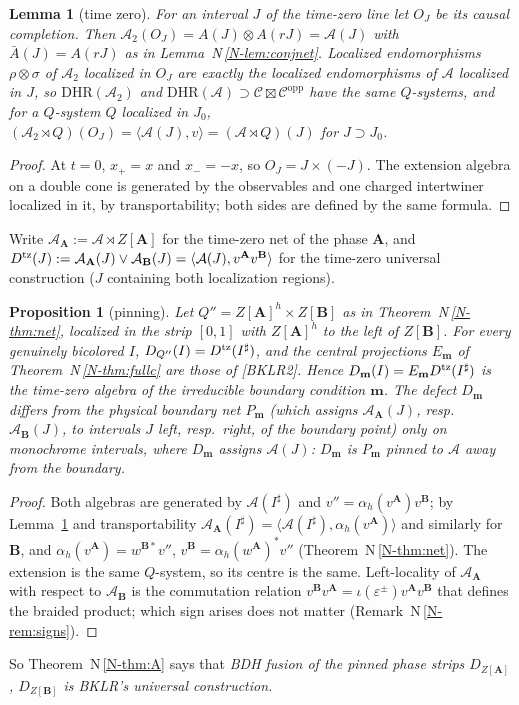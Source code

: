 \documentclass[11pt]{article}
\newtheorem{lemma}[theorem]{Lemma}
\newtheorem{proposition}[theorem]{Proposition}
\theoremstyle{definition}
\theoremstyle{remark}
\newcommand{\cA}{\mathcal A}
\newcommand{\bfB}{\mathbf B}
\newcommand{\bfA}{\mathbf A}
\newcommand{\nref}[1]{N\,\ref{N-#1}}
\begin{document}
\begin{lemma}[time zero]\label{lem:tz}
For an interval $J$ of the time-zero line let $O_J$ be its causal completion. Then $\cA_2(O_J)=A(J)\otimes A(rJ)=\cA(J)$ with $\bar A(J)=A(rJ)$ as in Lemma~\nref{lem:conjnet}. Localized endomorphisms $\rho\otimes\sigma$ of $\cA_2$ localized in $O_J$ are exactly the localized endomorphisms of $\cA$ localized in $J$, so $\mathrm{DHR}(\cA_2)$ and $\mathrm{DHR}(\cA)\supset\mathcal C\boxtimes\mathcal C^{\mathrm{opp}}$ have the same $Q$-systems, and for a $Q$-system $Q$ localized in $J_0$, $(\cA_2\rtimes Q)(O_J)=\langle\cA(J),v\rangle=(\cA\rtimes Q)(J)$ for $J\supset J_0$.
\end{lemma}
\begin{proof}
At $t=0$, $x_+=x$ and $x_-=-x$, so $O_J=J\times(-J)$. The extension algebra on a double cone is generated by the observables and one charged intertwiner localized in it, by transportability; both sides are defined by the same formula.
\end{proof}
Write $\cA_{\bfA}:=\cA\rtimes Z[\bfA]$ for the time-zero net of the phase $\bfA$, and $D^{\rm tz}(J):=\cA_{\bfA}(J)\vee\cA_{\bfB}(J)=\langle\cA(J),v^{\bfA}v^{\bfB}\rangle$ for the time-zero universal construction ($J$ containing both localization regions).

\begin{proposition}[pinning]\label{prop:pinning}
Let $Q''=Z[\bfA]^h\times Z[\bfB]$ as in Theorem~\nref{thm:net}, localized in the strip $[0,1]$ with $Z[\bfA]^h$ to the left of $Z[\bfB]$. For every genuinely bicolored $I$, $D_{Q''}(I)=D^{\rm tz}(I^\sharp)$, and the central projections $E_{\mathbf m}$ of Theorem~\nref{thm:fullc} are those of [BKLR2]. Hence $D_{\mathbf m}(I)=E_{\mathbf m}D^{\rm tz}(I^\sharp)$ is the time-zero algebra of the irreducible boundary condition $\mathbf m$. The defect $D_{\mathbf m}$ differs from the physical boundary net $P_{\mathbf m}$ (which assigns $\cA_{\bfA}(J)$, resp.\ $\cA_{\bfB}(J)$, to intervals $J$ left, resp.\ right, of the boundary point) only on monochrome intervals, where $D_{\mathbf m}$ assigns $\cA(J)$: $D_{\mathbf m}$ is $P_{\mathbf m}$ \emph{pinned} to $\cA$ away from the boundary.
\end{proposition}
\begin{proof}
Both algebras are generated by $\cA(I^\sharp)$ and $v''=\alpha_h(v^{\bfA})v^{\bfB}$; by Lemma~\ref{lem:tz} and transportability $\cA_{\bfA}(I^\sharp)=\langle\cA(I^\sharp),\alpha_h(v^{\bfA})\rangle$ and similarly for $\bfB$, and $\alpha_h(v^{\bfA})=w^{\bfB*}v''$, $v^{\bfB}=\alpha_h(w^{\bfA})^*v''$ (Theorem~\nref{thm:net}). The extension is the same $Q$-system, so its centre is the same. Left-locality of $\cA_{\bfA}$ with respect to $\cA_{\bfB}$ is the commutation relation $v^{\bfB}v^{\bfA}=\iota(\varepsilon^\pm)v^{\bfA}v^{\bfB}$ that defines the braided product; which sign arises does not matter (Remark~\nref{rem:signs}).
\end{proof}
So Theorem~\nref{thm:A} says that \emph{BDH fusion of the pinned phase strips $D_{Z[\bfA]}$, $D_{Z[\bfB]}$ is BKLR's universal construction.}
\end{document}
